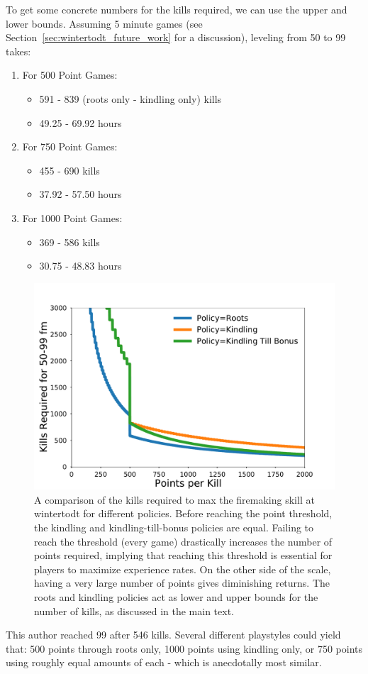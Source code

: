 		To get some concrete numbers for the kills required, we can use the upper and lower bounds. Assuming 5 minute games (see Section~\ref{sec:wintertodt_future_work} for a discussion), leveling from 50 to 99 takes: 
		\begin{enumerate}
			\item For 500 Point Games:
			\begin{itemize}
		        \item 591 - 839 (roots only - kindling only) kills
		        \item 49.25 - 69.92 hours
	    	\end{itemize}
	    	\item For 750 Point Games:
	        \begin{itemize}
		        \item 455 - 690 kills
		        \item 37.92 - 57.50 hours
	    	\end{itemize}
	    	\item For 1000 Point Games:
	        \begin{itemize}
		        \item 369 - 586 kills
		        \item 30.75 - 48.83 hours
	    	\end{itemize}
	    \end{enumerate}
		\begin{figure}
			\centering
			\includegraphics[width=\linewidth]{examples/firemaking/policies.pdf}
			\caption{
				A comparison of the kills required to max the firemaking skill at wintertodt for different policies. Before reaching the point threshold, the kindling and kindling-till-bonus policies are equal. Failing to reach the threshold (every game) drastically increases the number of points required, implying that reaching this threshold is essential for players to maximize experience rates. On the other side of the scale, having a very large number of points gives diminishing returns. The roots and kindling policies act as lower and upper bounds for the number of kills, as discussed in the main text.
			}
			\label{fig:wintertodt_policies}
		\end{figure}
		This author reached 99 after 546 kills. Several different playstyles could yield that: 500 points through roots only, 1000 points using kindling only, or 750 points using roughly equal amounts of each - which is anecdotally most similar.

